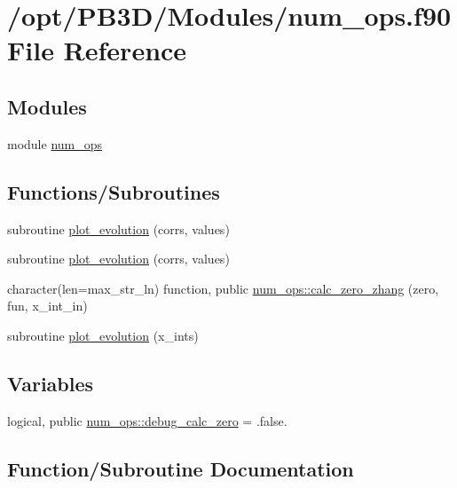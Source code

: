 \hypertarget{num__ops_8f90}{}\section{/opt/\+P\+B3\+D/\+Modules/num\+\_\+ops.f90 File Reference}
\label{num__ops_8f90}
\subsection*{Modules}
\begin{DoxyCompactItemize}
\item 
module \hyperlink{namespacenum__ops}{num\+\_\+ops}
\end{DoxyCompactItemize}
\subsection*{Functions/\+Subroutines}
\begin{DoxyCompactItemize}
\item 
subroutine \hyperlink{num__ops_8f90_a43693003de2d8d2713ff625bd461ead1}{plot\+\_\+evolution} (corrs, values)
\item 
subroutine \hyperlink{num__ops_8f90_a6a38b3677a2698fd1d3b59a9ee052fe1}{plot\+\_\+evolution} (corrs, values)
\item 
character(len=max\+\_\+str\+\_\+ln) function, public \hyperlink{namespacenum__ops_adcc4eacf15c931744316a004f4448b90}{num\+\_\+ops\+::calc\+\_\+zero\+\_\+zhang} (zero, fun, x\+\_\+int\+\_\+in)
\item 
subroutine \hyperlink{num__ops_8f90_aa37b5a8d2af52928606b47de8d3f7be2}{plot\+\_\+evolution} (x\+\_\+ints)
\end{DoxyCompactItemize}
\subsection*{Variables}
\begin{DoxyCompactItemize}
\item 
logical, public \hyperlink{namespacenum__ops_aca06cb91f215c46429e23fbaf8611e5a}{num\+\_\+ops\+::debug\+\_\+calc\+\_\+zero} = .false.
\end{DoxyCompactItemize}


\subsection{Function/\+Subroutine Documentation}
\mbox{\label{num__ops_8f90_a43693003de2d8d2713ff625bd461ead1}} 
